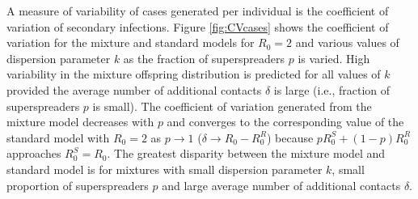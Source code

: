 \documentclass{imammb}
\numberwithin{equation}{section}
\begin{document}
{%

 A measure of variability of cases generated per individual is the coefficient of variation of secondary infections.  Figure \ref{fig:CVcases} shows the coefficient of variation for the mixture and standard models for $R_0=2$ and various values of dispersion parameter $k$ as the fraction of superspreaders $p$ is varied. High variability in the mixture offspring distribution is predicted for all values of $k$ provided the average number of additional contacts $\delta$ is large (i.e., fraction of superspreaders $p$ is small). The coefficient of variation generated from the mixture model decreases with $p$ and converges to the corresponding value of the standard model with $R_0=2$ as $p\rightarrow 1$ ($\delta\rightarrow R_0-R_0^R$) because $p R_0^S+(1-p)R_0^R$ approaches $R_0^S = R_0$. The greatest disparity between the mixture model and standard model is for mixtures with small dispersion parameter $k$, small proportion of superspreaders $p$ and large average number of additional contacts $\delta$. 
 
}
\end{document}
